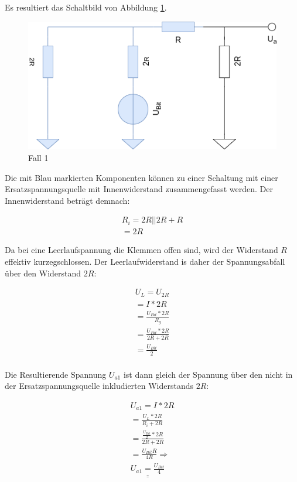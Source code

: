 Es resultiert das Schaltbild von Abbildung \ref{fig:fall-1}.
\begin{figure}[h]
    \centering
    \includegraphics[width=\textwidth]{pictures/a5-1-fall-1.png}
    \caption{Fall 1}
    \label{fig:fall-1}
\end{figure}

Die mit Blau markierten Komponenten können  zu einer Schaltung mit einer Ersatzspannungsquelle mit Innenwiderstand zusammengefasst werden.
Der Innenwiderstand beträgt demnach:

\begin{align}
    R_i = 2R || 2R + R \\
    = 2R
\end{align}

Da bei eine Leerlaufspannung die Klemmen offen sind, wird der Widerstand $R$ effektiv kurzegschlossen.
Der Leerlaufwiderstand is daher der Spannungsabfall über den Widerstand $2R$:

\begin{align}
    U_L = U_{2R} \\
    = I * 2R \\
    = \frac{U_{Bit}*2R}{R_g} \\
    = \frac{U_{Bit}*2R}{2R + 2R} \\
    = \frac{U_{Bit}}{2} \\
\end{align}

Die Resultierende Spannung $U_{a1}$ ist dann gleich der Spannung über den nicht in der Ersatzspannungsquelle inkludierten Widerstands $2R$:

\begin{align}
    U_{a1} = I * 2R \\
    = \frac{U_L * 2R}{R_i + 2R} \\
    = \frac{\frac{U_{Bit}}{2} * 2R}{2R + 2R} \\
    = \frac{U_{Bit}R}{4R} \Rightarrow\\
    \underline{\underline{U_{a1} = \frac{U_{Bit}}{4}}}
\end{align}

